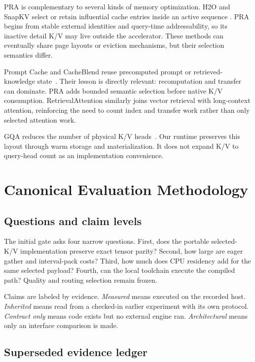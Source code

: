 \documentclass[11pt]{article}
\begin{document}
PRA is complementary to several kinds of memory optimization.  H2O and SnapKV
select or retain influential cache entries inside an active sequence
\cite{zhang2023h2o,li2024snapkv}.  PRA begins from stable external identities and
query-time addressability, so its inactive detail K/V may live outside the
accelerator.  These methods can eventually share page layouts or eviction
mechanisms, but their selection semantics differ.

Prompt Cache and CacheBlend reuse precomputed prompt or retrieved-knowledge
state~\cite{gim2023promptcache,yao2024cacheblend}.  Their lesson is directly
relevant: recomputation and transfer can dominate.  PRA adds bounded semantic
selection before native K/V consumption.  RetrievalAttention similarly joins
vector retrieval with long-context attention, reinforcing the need to count
index and transfer work rather than only selected attention work.

GQA reduces the number of physical K/V heads~\cite{ainslie2023gqa}.  Our runtime
preserves this layout through warm storage and materialization.  It does not
expand K/V to query-head count as an implementation convenience.

\section{Canonical Evaluation Methodology}

\subsection{Questions and claim levels}

The initial gate asks four narrow questions.  First, does the portable selected-
K/V implementation preserve exact tensor parity?  Second, how large are eager
gather and interval-pack costs?  Third, how much does CPU residency add for the
same selected payload?  Fourth, can the local toolchain execute the compiled
path?  Quality and routing selection remain frozen.

Claims are labeled by evidence.  \emph{Measured} means executed on the recorded
host.  \emph{Inherited} means read from a checked-in earlier experiment with
its own protocol.  \emph{Contract only} means code exists but no external
engine ran.  \emph{Architectural} means only an interface comparison is made.

\subsection{Superseded evidence ledger}
\end{document}
